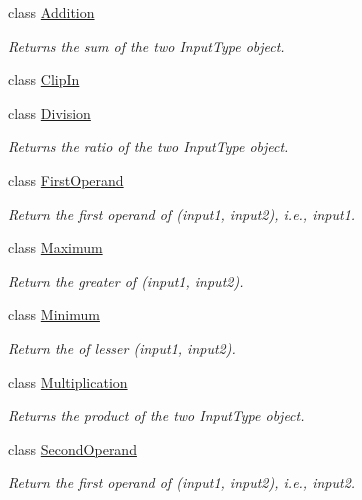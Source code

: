 \begin{DoxyCompactItemize}
\item 
class \hyperlink{classvct_store_back_binary_operations_1_1_addition}{Addition}
\begin{DoxyCompactList}\small\item\em Returns the sum of the two Input\+Type object. \end{DoxyCompactList}\item 
class \hyperlink{classvct_store_back_binary_operations_1_1_clip_in}{Clip\+In}
\item 
class \hyperlink{classvct_store_back_binary_operations_1_1_division}{Division}
\begin{DoxyCompactList}\small\item\em Returns the ratio of the two Input\+Type object. \end{DoxyCompactList}\item 
class \hyperlink{classvct_store_back_binary_operations_1_1_first_operand}{First\+Operand}
\begin{DoxyCompactList}\small\item\em Return the first operand of (input1, input2), i.\+e., input1. \end{DoxyCompactList}\item 
class \hyperlink{classvct_store_back_binary_operations_1_1_maximum}{Maximum}
\begin{DoxyCompactList}\small\item\em Return the greater of (input1, input2). \end{DoxyCompactList}\item 
class \hyperlink{classvct_store_back_binary_operations_1_1_minimum}{Minimum}
\begin{DoxyCompactList}\small\item\em Return the of lesser (input1, input2). \end{DoxyCompactList}\item 
class \hyperlink{classvct_store_back_binary_operations_1_1_multiplication}{Multiplication}
\begin{DoxyCompactList}\small\item\em Returns the product of the two Input\+Type object. \end{DoxyCompactList}\item 
class \hyperlink{classvct_store_back_binary_operations_1_1_second_operand}{Second\+Operand}
\begin{DoxyCompactList}\small\item\em Return the first operand of (input1, input2), i.\+e., input2. \end{DoxyCompactList}\item 

\end{DoxyCompactItemize}
